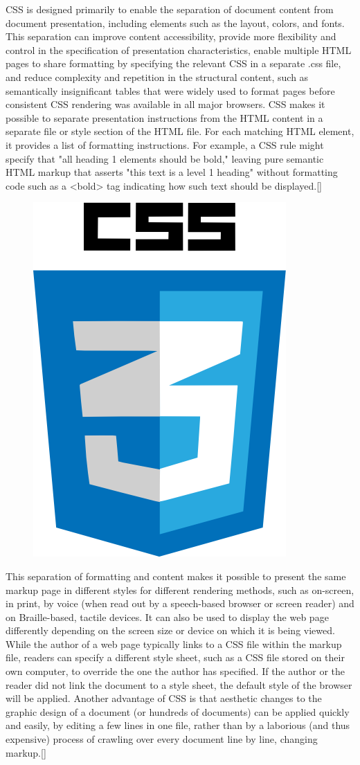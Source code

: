 CSS is designed primarily to enable the separation of document content from document presentation, including elements such as the layout, colors, and fonts. This separation can improve content accessibility, provide more flexibility and control in the specification of presentation characteristics, enable multiple HTML pages to share formatting by specifying the relevant CSS in a separate .css file, and reduce complexity and repetition in the structural content, such as semantically insignificant tables that were widely used to format pages before consistent CSS rendering was available in all major browsers. CSS makes it possible to separate presentation instructions from the HTML content in a separate file or style section of the HTML file. For each matching HTML element, it provides a list of formatting instructions. For example, a CSS rule might specify that "all heading 1 elements should be bold," leaving pure semantic HTML markup that asserts "this text is a level 1 heading" without formatting code such as a <bold> tag indicating how such text should be displayed.[\cite{7}]
\newline
\begin{figure}[h]
		\centering
		\includegraphics[width=0.4\linewidth]{images/css3_icon}
		\label{fig:css-logo}
\end{figure}
This separation of formatting and content makes it possible to present the same markup page in different styles for different rendering methods, such as on-screen, in print, by voice (when read out by a speech-based browser or screen reader) and on Braille-based, tactile devices. It can also be used to display the web page differently depending on the screen size or device on which it is being viewed. While the author of a web page typically links to a CSS file within the markup file, readers can specify a different style sheet, such as a CSS file stored on their own computer, to override the one the author has specified. If the author or the reader did not link the document to a style sheet, the default style of the browser will be applied. Another advantage of CSS is that aesthetic changes to the graphic design of a document (or hundreds of documents) can be applied quickly and easily, by editing a few lines in one file, rather than by a laborious (and thus expensive) process of crawling over every document line by line, changing markup.[\cite{7}]
\newline

